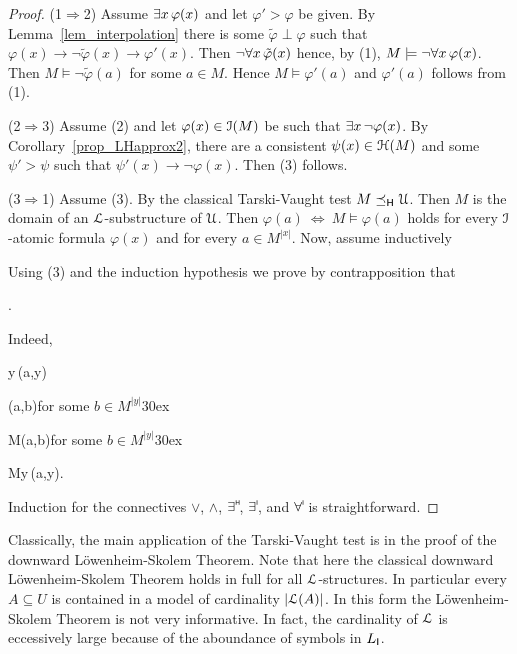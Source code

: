 \documentclass[10pt,oneside]{amsproc}
\begin{document}
\begin{proof}
  (1$\Rightarrow$2) Assume $\exists x\,\varphi(x)$ and let $\varphi'>\varphi$ be given.
  By Lemma~\ref{lem_interpolation} there is some $\tilde{\varphi}\perp\varphi$ such that  $\varphi(x)\rightarrow\neg\tilde{\varphi}(x)\rightarrow\varphi'(x)$.
  Then $\neg\forall x\,\tilde{\varphi}(x)$ hence, by (1), $M\models\neg\forall x\,\varphi(x)$.
  Then $M\models\neg\tilde{\varphi}(a)$ for some $a\in M$. Hence $M\models\varphi'(a)$ and $\varphi'(a)$ follows from (1).

  (2$\Rightarrow$3)
  Assume (2) and let $\varphi(x)\in{\EuScript I}(M)$ be such that $\exists x\,\neg\varphi(x)$.
  By Corollary~\ref{prop_LHapprox2}, there are a consistent $\psi(x)\in{\EuScript H}(M)$ and some $\psi'>\psi$ such that $\psi'(x)\rightarrow\neg\varphi(x)$.
  Then (3) follows.

  (3$\Rightarrow$1)
  Assume (3).
  By the classical Tarski-Vaught test $M\preceq_{\sf H}{\EuScript U}$.
  Then $M$ is the domain of an ${\EuScript L}$-substructure of ${\EuScript U}$.
  Then  $\varphi(a)\ \Leftrightarrow\ M\models\varphi(a)$ holds for every ${\EuScript I}$-atomic formula $\varphi(x)$ and for every $a\in M^{|x|}$.
  Now, assume inductively
  

  Using (3) and the induction hypothesis we prove by contrapposition that

  .

  Indeed,

  {\Rightarrow}{\existsH y\,\neg\varphi(a,y)}
  
  \ceq{}
  {\Rightarrow}
  {\neg\varphi(a,b)}\hfill for some $b\in M^{|y|}$\kern30ex

  \ceq{}
  {\Rightarrow}
  {M\models\neg\varphi(a,b)}\hfill for some $b\in M^{|y|}$\kern30ex

  \ceq{}
  {\Rightarrow}
  {M\not\models\forallH y\,\varphi(a,y).}

  Induction for the connectives $\vee$, $\wedge$, $\exists\raisebox{1.1ex}{\scaleto{\sf H}{.8ex}\kern-.2ex}$, $\exists\raisebox{1.1ex}{\scaleto{\sf I}{.8ex}\kern-.2ex}$, and $\forall\raisebox{1.1ex}{\scaleto{\sf I}{.8ex}\kern-.2ex}$ is straightforward.
\end{proof}

Classically, the main application of the Tarski-Vaught test is in the proof of the downward L\"owenheim-Skolem Theorem.
Note that here the classical downward L\"owenheim-Skolem Theorem holds in full for all ${\EuScript L}$-structures.
In particular every $A\subseteq U$ is contained in a model of cardinality $|{\EuScript L}(A)|$.
In this form the L\"owenheim-Skolem Theorem is not very informative.
In fact, the cardinality of ${\EuScript L}$ is eccessively large because of the aboundance of symbols in $L_{\sf I}$.
\end{document}
